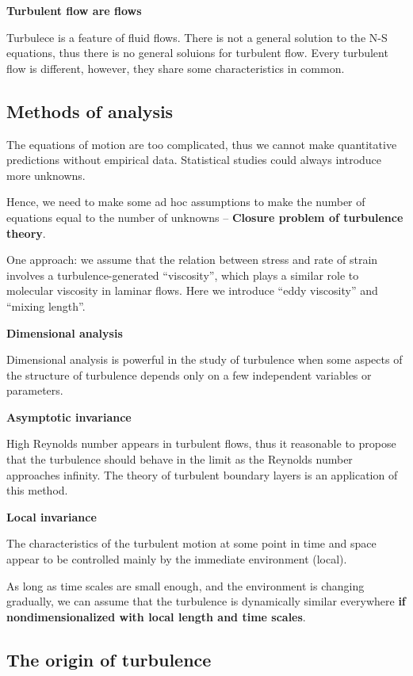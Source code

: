 \documentclass{article}
\begin{document}
\textbf{Turbulent flow are flows}

Turbulece is a feature of fluid flows. There is not a general solution to the N-S equations, thus there is no general soluions for turbulent flow.
Every turbulent flow is different, however, they share some characteristics in common.

\subsection{Methods of analysis}

The equations of motion are too complicated, thus we cannot make quantitative predictions without empirical data.
Statistical studies could always introduce more unknowns.

Hence, we need to make some ad hoc assumptions to make the number of equations equal to the number of unknowns -- \textbf{Closure problem of turbulence theory}.

One approach: we assume that the relation between stress and rate of strain involves a turbulence-generated ``viscosity'', which plays a similar role to molecular viscosity in laminar flows.
Here we introduce ``eddy viscosity'' and ``mixing length''.

\textbf{Dimensional analysis}

Dimensional analysis is powerful in the study of turbulence when some aspects of the structure of turbulence depends only on a few independent variables or parameters.

\textbf{Asymptotic invariance}

High Reynolds number appears in turbulent flows, thus it reasonable to propose that the turbulence should behave in the limit as the Reynolds number approaches infinity.
The theory of turbulent boundary layers is an application of this method.

\textbf{Local invariance}

The characteristics of the turbulent motion at some point in time and space appear to be controlled mainly by the immediate environment (local).

As long as time scales are small enough, and the environment is changing gradually, we can assume that the turbulence is dynamically similar everywhere \textbf{if nondimensionalized with local length and time scales}.

\subsection{The origin of turbulence}
\end{document}
